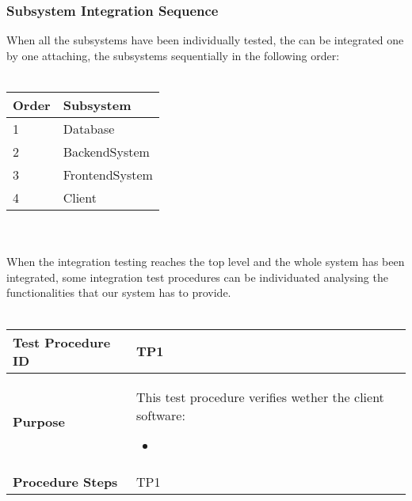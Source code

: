		\subsubsection{Subsystem Integration Sequence}
			When all the subsystems have been individually tested, the can be integrated one by one
			attaching, the subsystems sequentially in the following order:
			\\ \\
			\begin{tabular}{p{2cm} | p{10cm}} \hline
				\textbf{Order} & \textbf{Subsystem} \\ \hline
				1 & Database \\ \hline
				2 & BackendSystem \\ \hline
				3 & FrontendSystem \\ \hline
				4 & Client \\ \hline
			\end{tabular}
			\\ \\
			When the integration testing reaches the top level and the whole system has been integrated,
			some integration test procedures can be individuated analysing the functionalities that our system
			has to provide.
			\\ \\
			\begin{tabular}{p{3cm} | p{7cm}} \hline
				\textbf{Test Procedure ID} & TP1 \\ \hline
				\textbf{Purpose} & This test procedure verifies wether the client software:
					\begin{itemize}
						\item 
					\end{itemize}
				\\ \hline
				\textbf{Procedure Steps} & TP1 \\ \hline
			\end{tabular}